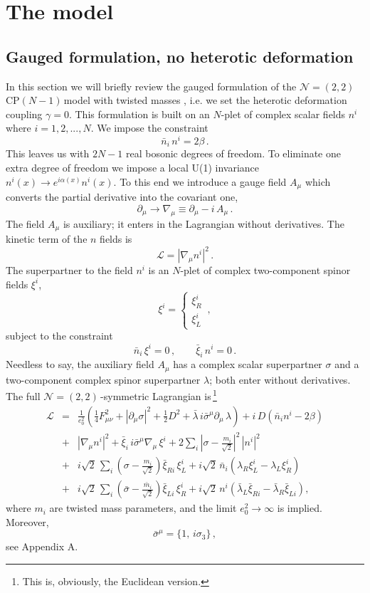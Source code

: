 \documentclass[epsfig,12pt]{article}
\def\beq{\begin{equation}}
\def\eeq{\end{equation}}
\def\beqn{\begin{eqnarray}}
\def\eeqn{\end{eqnarray}}
\newcommand{\ntt}{${\mathcal N}=(2,2)\,$}
\newcommand{\cpn}{CP$(N-1)\,$}
\newcommand{\cell}{{\mathcal L}}
\newcommand{\pt}{\partial}
\def\beqn{\begin{eqnarray}}
\def\eeqn{\end{eqnarray}}
\def\beq{\begin{equation}}
\def\eeq{\end{equation}}
\begin{document}
\section{The model}
\setcounter{equation}{0}

\subsection{Gauged formulation, no heterotic deformation}

In this section we will briefly review the gauged formulation \cite{W79,W93} of
the \mbox{\ntt} \cpn model with twisted masses
\cite{twisted}, i.e. we set the heterotic deformation coupling
$\gamma = 0$.
This formulation is built on an $N$-plet of complex scalar fields $n^i$ where $i=1,2,...,N$.
We impose the constraint
\beq
\bar n_i \,n^i = 2\beta \,.
\eeq
This leaves us with $2N-1$ real bosonic degrees of freedom. To eliminate one extra degree
of freedom we impose a local U(1) invariance $n^i(x)\to e^{i\alpha(x)} n^i(x)$.
To this end we introduce a gauge field $A_\mu$ which converts the partial derivative into the
covariant one,
\beq
\partial_\mu\to \nabla_\mu \equiv \partial_\mu -i\,  A_\mu\,.
\eeq
The field $A_\mu$ is auxiliary; it enters in the Lagrangian without derivatives. The kinetic term of the
$n$ fields is
\beq
\cell  = \left|\nabla_\mu n^i\right|^2\,.
\eeq
The superpartner to the field $n^i$ is an $N$-plet of complex two-component spinor fields $\xi^i$,
\beq
\xi^i =\left\{\begin{array}{l}
\xi^i_R\\[2mm]
\xi^i_L
\end{array}
\right.\,,
\eeq
subject to the constraint
\beq
\bar{n}_i\,\xi^i =0\,,\qquad \bar\xi_i\,n^i = 0\,.
\label{npxi}
\eeq
Needless to say, the auxiliary field $A_\mu$ has a complex scalar superpartner $\sigma$ 
and a two-component complex spinor superpartner $\lambda$; both enter without derivatives.
The full \ntt-symmetric Lagrangian is\,\footnote{This is, obviously, the Euclidean version.}
\beqn
\cell &=& 
\frac{1}{e_0^2}\left(\frac{1}{4} F_{\mu\nu}^2 +\left|\pt_\mu\sigma\right|^2 + \frac{1}{2}D^2
+\bar\lambda \, i\bar{\sigma}^\mu\pt_\mu\,\lambda
\right) + i\,D\left(\bar{n}_i n^i -2\beta
\right)
\nonumber\\[3mm]
&+&
\left|\nabla_\mu n^i\right|^2+ \bar{\xi}_i\, i\bar{\sigma}^\mu\nabla_\mu\,\xi^i
+ 2\sum_i\left|\sigma-\frac{m_i}{\sqrt 2}\right|^2\, |n^i|^2
\nonumber\\[3mm]
&+&
i\sqrt{2}\,\sum_i \left( \sigma -\frac{m_i}{\sqrt 2}\right)\bar\xi_{Ri}\, \xi^i_L +i\sqrt{2}\,\bar{n}_i
\left(\lambda_R\xi^i_L - \lambda_L\xi^i_R
\right)
\nonumber\\
&+&
i\sqrt{2}\,\sum_i \left( \bar\sigma -\frac{\bar{m}_i}{\sqrt 2}\right)\bar\xi_{Li}\, \xi^i_R +i\sqrt{2}\,{n}^i
\left(\bar\lambda_L\bar\xi_{Ri} - \bar\lambda_R\bar\xi_{Li}
\right),
\label{bee31}
\eeqn
where $m_i$ are twisted mass parameters, and the limit $e_0^2\to\infty$ is implied. 
Moreover,
\beq
\bar\sigma^\mu = \{1,\,i\sigma_3\}\,,
\label{wtpi3}
\eeq
see Appendix A.
\end{document}

